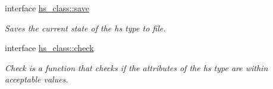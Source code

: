 \begin{DoxyCompactItemize}
interface \hyperlink{interfacehs__class_1_1save}{hs\+\_\+class\+::save}
\begin{DoxyCompactList}\small\item\em Saves the current state of the hs type to file. \end{DoxyCompactList}\item 
interface \hyperlink{interfacehs__class_1_1check}{hs\+\_\+class\+::check}
\begin{DoxyCompactList}\small\item\em Check is a function that checks if the attributes of the hs type are within acceptable values. \end{DoxyCompactList}\end{DoxyCompactItemize}
